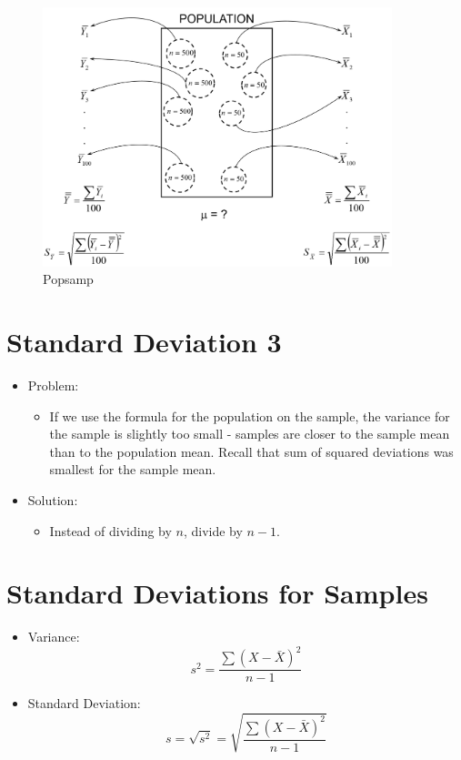 \documentclass[12pt]{article}
\begin{document}
\begin{figure}[H]
\centering
\includegraphics[width=4in]{popSDsize.png}
\caption{Popsamp}
\end{figure}

\section{Standard Deviation 3}\label{standard-deviation-3}

\begin{itemize}
\itemsep1pt\parskip0pt
\item
  Problem:

  \begin{itemize}
  \itemsep1pt\parskip0pt
  \item
    If we use the formula for the population on the sample, the variance
    for the sample is slightly too small - samples are closer to the
    sample mean than to the population mean. Recall that sum of squared
    deviations was smallest for the sample mean.
  \end{itemize}
\item
  Solution:

  \begin{itemize}
  \itemsep1pt\parskip0pt
  \item
    Instead of dividing by \(n\), divide by \(n-1\).
  \end{itemize}
\end{itemize}

\section{Standard Deviations for
Samples}\label{standard-deviations-for-samples}

\begin{itemize}
\itemsep1pt\parskip0pt
\item
  Variance: \[ s^2 = \frac{\sum (X - \bar{X})^2}{n - 1} \]
\item
  Standard Deviation:
  \[ s = \sqrt{s^2} = \sqrt{\frac{\sum (X - \bar{X})^2}{n - 1}} \]
\end{itemize}
\end{document}
